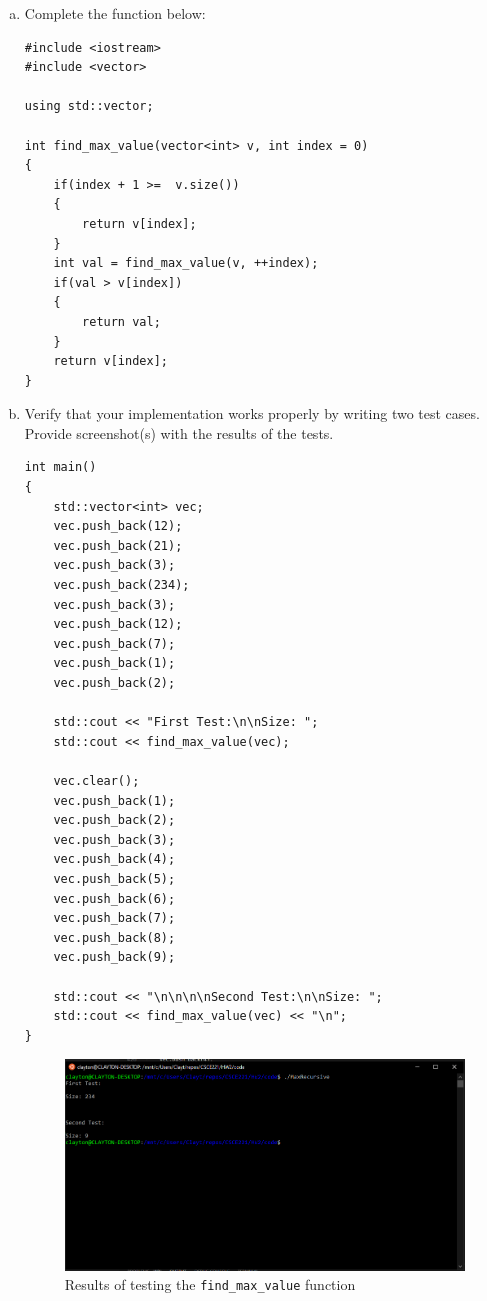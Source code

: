 \documentclass[english]{article}
\newcommand*{\code}[1]{\texttt{#1}}
\begin{document}
\begin{enumerate}[(a)]
  \item Complete the function below:

\begin{lstlisting}
#include <iostream>
#include <vector>

using std::vector;

int find_max_value(vector<int> v, int index = 0)
{
    if(index + 1 >=  v.size())
    {
        return v[index];
    }
    int val = find_max_value(v, ++index);
    if(val > v[index])
    {
        return val;
    }
    return v[index];
}
\end{lstlisting}

  \item Verify that your implementation works properly by writing two test cases. Provide screenshot(s) with the results of the tests.

\begin{lstlisting}
int main()
{
    std::vector<int> vec;
    vec.push_back(12);
    vec.push_back(21);
    vec.push_back(3);
    vec.push_back(234);
    vec.push_back(3);
    vec.push_back(12);
    vec.push_back(7);
    vec.push_back(1);
    vec.push_back(2);

    std::cout << "First Test:\n\nSize: ";
    std::cout << find_max_value(vec);

    vec.clear();
    vec.push_back(1);
    vec.push_back(2);
    vec.push_back(3);
    vec.push_back(4);
    vec.push_back(5);
    vec.push_back(6);
    vec.push_back(7);
    vec.push_back(8);
    vec.push_back(9);

    std::cout << "\n\n\n\nSecond Test:\n\nSize: ";
    std::cout << find_max_value(vec) << "\n";
}
\end{lstlisting}

  \begin{figure}[H]
    \centering
    \includegraphics[width=0.8\linewidth]{3-test.png}
    \caption{Results of testing the \code{find\_max\_value} function}%
    \label{fig:find_max_value}
  \end{figure}  


\end{enumerate}
\end{document}

